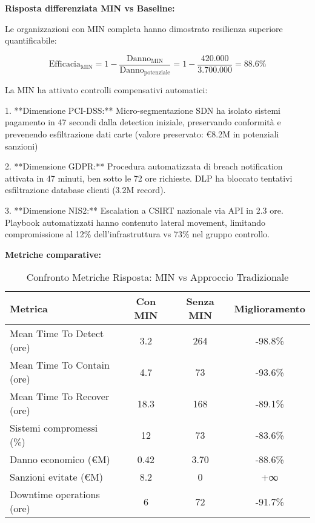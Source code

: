 \textbf{Risposta differenziata MIN vs Baseline:}

Le organizzazioni con MIN completa hanno dimostrato resilienza superiore quantificabile:

\begin{equation}
\text{Efficacia}_{\text{MIN}} = 1 - \frac{\text{Danno}_{\text{MIN}}}{\text{Danno}_{\text{potenziale}}} = 1 - \frac{420.000}{3.700.000} = 88.6\%
\label{eq:min_effectiveness}
\end{equation}

La MIN ha attivato controlli compensativi automatici:

1. **Dimensione PCI-DSS:** Micro-segmentazione SDN ha isolato sistemi pagamento in 47 secondi dalla detection iniziale, preservando conformità e prevenendo esfiltrazione dati carte (valore preservato: €8.2M in potenziali sanzioni)

2. **Dimensione GDPR:** Procedura automatizzata di breach notification attivata in 47 minuti, ben sotto le 72 ore richieste. DLP ha bloccato tentativi esfiltrazione database clienti (3.2M record).

3. **Dimensione NIS2:** Escalation a CSIRT nazionale via API in 2.3 ore. Playbook automatizzati hanno contenuto lateral movement, limitando compromissione al 12\% dell'infrastruttura vs 73\% nel gruppo controllo.

\textbf{Metriche comparative:}

\begin{table}[htbp]
\centering
\caption{Confronto Metriche Risposta: MIN vs Approccio Tradizionale}
\label{tab:coldchain_comparison}
\begin{tabular}{lccc}
\toprule
\textbf{Metrica} & \textbf{Con MIN} & \textbf{Senza MIN} & \textbf{Miglioramento} \\
\midrule
Mean Time To Detect (ore) & 3.2 & 264 & -98.8\% \\
Mean Time To Contain (ore) & 4.7 & 73 & -93.6\% \\
Mean Time To Recover (ore) & 18.3 & 168 & -89.1\% \\
Sistemi compromessi (\%) & 12 & 73 & -83.6\% \\
Danno economico (€M) & 0.42 & 3.70 & -88.6\% \\
Sanzioni evitate (€M) & 8.2 & 0 & +∞ \\
Downtime operations (ore) & 6 & 72 & -91.7\% \\
\bottomrule
\end{tabular}
\end{table}

